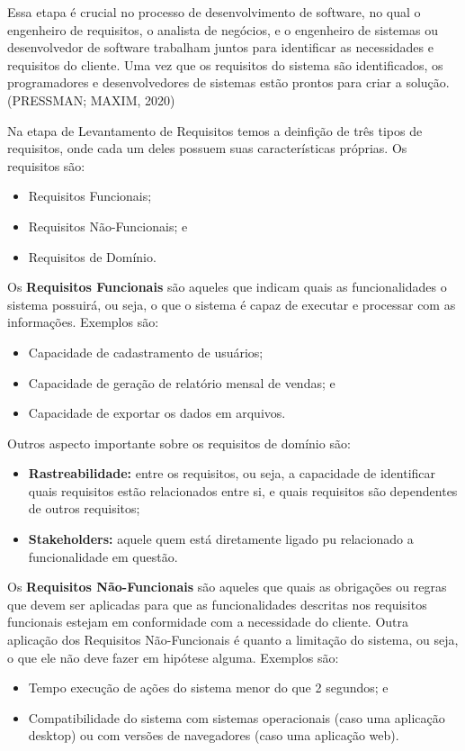 \documentclass[a4paper,12pt]{article}
\begin{document}
Essa etapa é crucial no processo de desenvolvimento de software, no qual o engenheiro de requisitos, o analista de negócios, e 
o engenheiro de sistemas ou desenvolvedor de software trabalham juntos para identificar as necessidades e requisitos do cliente. Uma 
vez que os requisitos do sistema são identificados, os programadores e desenvolvedores de sistemas estão prontos para criar a solução. (PRESSMAN; MAXIM, 2020)

Na etapa de Levantamento de Requisitos temos a deinfição de três tipos de requisitos, onde cada um deles possuem suas 
características próprias. Os requisitos são:
\begin{itemize}
	\item Requisitos Funcionais;
	\item Requisitos Não-Funcionais; e
	\item Requisitos de Domínio.
\end{itemize}

\vspace{1cm}
Os \textbf{Requisitos Funcionais} são aqueles que indicam quais as funcionalidades o sistema possuirá, ou seja, o que o sistema 
é capaz de executar e processar com as informações. Exemplos são:
\begin{itemize}
	\item Capacidade de cadastramento de usuários;
	\item Capacidade de geração de relatório mensal de vendas; e
	\item Capacidade de exportar os dados em arquivos.
\end{itemize}
Outros aspecto importante sobre os requisitos de domínio são: 
\begin{itemize}
	\item\textbf{Rastreabilidade:} entre os requisitos, ou seja, a capacidade de identificar quais requisitos estão 
	relacionados entre si, e quais requisitos são dependentes de outros requisitos;
	\item\textbf{Stakeholders:} aquele quem está diretamente ligado pu relacionado a funcionalidade em questão.
\end{itemize}


Os \textbf{Requisitos Não-Funcionais} são aqueles que quais as obrigações ou regras que devem ser aplicadas para que as 
funcionalidades descritas nos requisitos funcionais estejam em conformidade com a necessidade do cliente.
Outra aplicação dos Requisitos Não-Funcionais é quanto a limitação do sistema, ou seja, o que ele não deve fazer 
em hipótese alguma. Exemplos são:
\begin{itemize}
	\item Tempo execução de ações do sistema menor do que 2 segundos; e
	\item Compatibilidade do sistema com sistemas operacionais (caso uma aplicação desktop) ou com versões de 
	navegadores (caso uma aplicação web).
\end{itemize}
\end{document}
